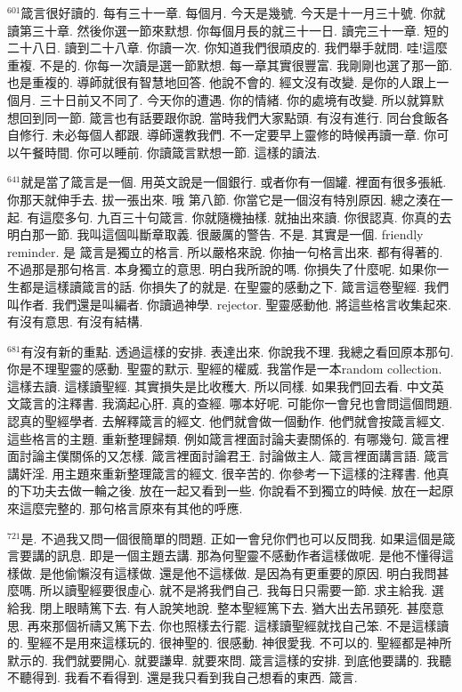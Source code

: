 \documentclass{book}
\begin{document}
$^{601}$箴言很好讀的.
每有三十一章.
每個月.
今天是幾號.
今天是十一月三十號.
你就讀第三十章.
然後你選一節來默想.
你每個月長的就三十一日.
讀完三十一章.
短的二十八日.
讀到二十八章.
你讀一次.
你知道我們很頑皮的.
我們舉手就問.
哇!這麼重複.
不是的.
你每一次讀是選一節默想.
每一章其實很豐富.
我剛剛也選了那一節.
也是重複的.
導師就很有智慧地回答.
他說不會的.
經文沒有改變.
是你的人跟上一個月.
三十日前又不同了.
今天你的遭遇.
你的情緒.
你的處境有改變.
所以就算默想回到同一節.
箴言也有話要跟你說.
當時我們大家點頭.
有沒有進行.
同台食飯各自修行.
未必每個人都跟.
導師還教我們.
不一定要早上靈修的時候再讀一章.
你可以午餐時間.
你可以睡前.
你讀箴言默想一節.
這樣的讀法.

$^{641}$就是當了箴言是一個.
用英文說是一個銀行.
或者你有一個罐.
裡面有很多張紙.
你那天就伸手去.
拔一張出來.
哦 第八節.
你當它是一個沒有特別原因.
總之湊在一起.
有這麼多句.
九百三十句箴言.
你就隨機抽樣.
就抽出來讀.
你很認真.
你真的去明白那一節.
我叫這個叫斷章取義.
很嚴厲的警告.
不是.
其實是一個.
friendly reminder.
是 箴言是獨立的格言.
所以嚴格來說.
你抽一句格言出來.
都有得著的.
不過那是那句格言.
本身獨立的意思.
明白我所說的嗎.
你損失了什麼呢.
如果你一生都是這樣讀箴言的話.
你損失了的就是.
在聖靈的感動之下.
箴言這卷聖經.
我們叫作者.
我們還是叫編者.
你讀過神學.
rejector.
聖靈感動他.
將這些格言收集起來.
有沒有意思.
有沒有結構.

$^{681}$有沒有新的重點.
透過這樣的安排.
表達出來.
你說我不理.
我總之看回原本那句.
你是不理聖靈的感動.
聖靈的默示.
聖經的權威.
我當作是一本random collection.
這樣去讀.
這樣讀聖經.
其實損失是比收穫大.
所以同樣.
如果我們回去看.
中文英文箴言的注釋書.
我滴起心肝.
真的查經.
哪本好呢.
可能你一會兒也會問這個問題.
認真的聖經學者.
去解釋箴言的經文.
他們就會做一個動作.
他們就會按箴言經文.
這些格言的主題.
重新整理歸類.
例如箴言裡面討論夫妻關係的.
有哪幾句.
箴言裡面討論主僕關係的又怎樣.
箴言裡面討論君王.
討論做主人.
箴言裡面講言語.
箴言講奸淫.
用主題來重新整理箴言的經文.
很辛苦的.
你參考一下這樣的注釋書.
他真的下功夫去做一輪之後.
放在一起又看到一些.
你說看不到獨立的時候.
放在一起原來這麼完整的.
那句格言原來有其他的呼應.

$^{721}$是.
不過我又問一個很簡單的問題.
正如一會兒你們也可以反問我.
如果這個是箴言要講的訊息.
即是一個主題去講.
那為何聖靈不感動作者這樣做呢.
是他不懂得這樣做.
是他偷懶沒有這樣做.
還是他不這樣做.
是因為有更重要的原因.
明白我問甚麼嗎.
所以讀聖經要很虛心.
就不是將我們自己.
我每日只需要一節.
求主給我.
選給我.
閉上眼睛篤下去.
有人說笑地說.
整本聖經篤下去.
猶大出去吊頸死.
甚麼意思.
再來那個祈禱又篤下去.
你也照樣去行罷.
這樣讀聖經就找自己笨.
不是這樣讀的.
聖經不是用來這樣玩的.
很神聖的.
很感動.
神很愛我.
不可以的.
聖經都是神所默示的.
我們就要開心.
就要謙卑.
就要來問.
箴言這樣的安排.
到底他要講的.
我聽不聽得到.
我看不看得到.
還是我只看到我自己想看的東西.
箴言.
\end{document}
